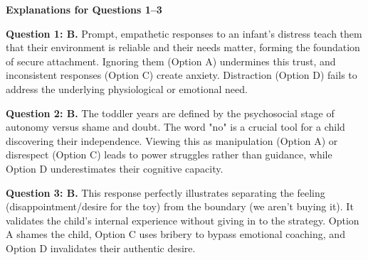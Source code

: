 \begin{practiceexercise}
\textbf{Explanations for Questions 1--3}

\textbf{Question 1: B.} Prompt, empathetic responses to an infant's distress teach them that their environment is reliable and their needs matter, forming the foundation of secure attachment. Ignoring them (Option A) undermines this trust, and inconsistent responses (Option C) create anxiety. Distraction (Option D) fails to address the underlying physiological or emotional need.

\textbf{Question 2: B.} The toddler years are defined by the psychosocial stage of autonomy versus shame and doubt. The word "no" is a crucial tool for a child discovering their independence. Viewing this as manipulation (Option A) or disrespect (Option C) leads to power struggles rather than guidance, while Option D underestimates their cognitive capacity.

\textbf{Question 3: B.} This response perfectly illustrates separating the feeling (disappointment/desire for the toy) from the boundary (we aren't buying it). It validates the child's internal experience without giving in to the strategy. Option A shames the child, Option C uses bribery to bypass emotional coaching, and Option D invalidates their authentic desire.
\newpage


\end{practiceexercise}
